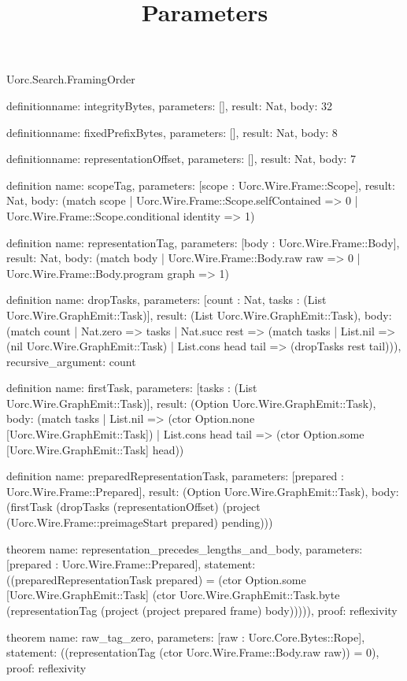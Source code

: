 \begin{lexlean}{Uorc.Search.FramingOrder}
\title{Parameters}
\begin{semanticmodule}
definition{name: integrityBytes, parameters: [], result: Nat, body: 32}

definition{name: fixedPrefixBytes, parameters: [], result: Nat, body: 8}

definition{name: representationOffset, parameters: [], result: Nat, body: 7}

definition{
  name: scopeTag,
  parameters: [scope : Uorc.Wire.Frame::Scope],
  result: Nat,
  body: (match scope
    | Uorc.Wire.Frame::Scope.selfContained => 0
    | Uorc.Wire.Frame::Scope.conditional identity => 1)
}

definition{
  name: representationTag,
  parameters: [body : Uorc.Wire.Frame::Body],
  result: Nat,
  body: (match body | Uorc.Wire.Frame::Body.raw raw => 0 | Uorc.Wire.Frame::Body.program graph => 1)
}

definition{
  name: dropTasks,
  parameters: [count : Nat, tasks : (List Uorc.Wire.GraphEmit::Task)],
  result: (List Uorc.Wire.GraphEmit::Task),
  body: (match count
    | Nat.zero => tasks
    | Nat.succ rest => (match tasks
      | List.nil => (nil Uorc.Wire.GraphEmit::Task)
      | List.cons head tail => (dropTasks rest tail))),
  recursive_argument: count
}

definition{
  name: firstTask,
  parameters: [tasks : (List Uorc.Wire.GraphEmit::Task)],
  result: (Option Uorc.Wire.GraphEmit::Task),
  body: (match tasks
    | List.nil => (ctor Option.none [Uorc.Wire.GraphEmit::Task])
    | List.cons head tail => (ctor Option.some [Uorc.Wire.GraphEmit::Task] head))
}

definition{
  name: preparedRepresentationTask,
  parameters: [prepared : Uorc.Wire.Frame::Prepared],
  result: (Option Uorc.Wire.GraphEmit::Task),
  body: (firstTask (dropTasks (representationOffset) (project (Uorc.Wire.Frame::preimageStart prepared) pending)))
}

theorem{
  name: representation_precedes_lengths_and_body,
  parameters: [prepared : Uorc.Wire.Frame::Prepared],
  statement: ((preparedRepresentationTask prepared) = (ctor Option.some [Uorc.Wire.GraphEmit::Task] (ctor Uorc.Wire.GraphEmit::Task.byte (representationTag (project (project prepared frame) body))))),
  proof: reflexivity{}
}

theorem{
  name: raw_tag_zero,
  parameters: [raw : Uorc.Core.Bytes::Rope],
  statement: ((representationTag (ctor Uorc.Wire.Frame::Body.raw raw)) = 0),
  proof: reflexivity{}
}


\end{semanticmodule}
\end{lexlean}
